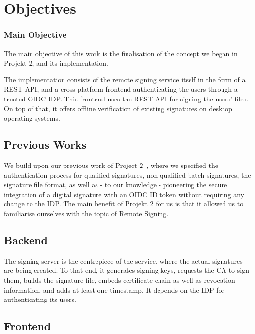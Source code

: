 \chapter{Objectives}
\label{ch:objectives}

\subsection{Main Objective}\label{subsec:main-objective}
The main objective of this work is the finalisation of the concept we began in Projekt 2,
and its implementation.

The implementation consists of the remote signing service itself in the form of a \gls{REST} \gls{API},
and a cross-platform frontend authenticating the users through a trusted \gls{OIDC} \gls{IDP}.
This frontend uses the \gls{REST} \gls{API} for signing the users' files.
On top of that, it offers offline verification of existing signatures on desktop operating systems.

\section{Previous Works}
\label{section:previousworks}

We build upon our previous work of Project 2~\cite{projekt2}, where we specified the authentication process
for qualified signatures, non-qualified batch signatures, the signature file format,
as well as - to our knowledge - pioneering the secure integration of a digital signature with an \gls{OIDC} ID token without requiring any change to the \gls{IDP}.
The main benefit of Projekt 2 for us is that it allowed us to familiarise ourselves with the topic of Remote Signing.


\section{Backend}
\label{section:backend}

The signing server is the centrepiece of the service, where the actual signatures are being created.
To that end, it generates signing keys,
requests the \gls{CA} to sign them,
builds the signature file, embeds certificate chain as well as revocation information,
and adds at least one timestamp.
It depends on the \gls{IDP} for authenticating its users.

\section{Frontend}
\label{section:frontend}

